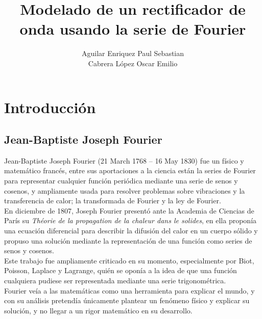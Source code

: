 \documentclass[a4paper,12pt]{article}
\title{Modelado de un rectificador de onda usando la serie de Fourier}
\author{
  Aguilar Enriquez Paul Sebastian\\
  Cabrera López Oscar Emilio
}
\begin{document}
\thispagestyle{fancy}
\maketitle
\newpage
\tableofcontents
\newpage

\section{Introducción}

\subsection{Jean-Baptiste Joseph Fourier}
\indent Jean-Baptiste Joseph Fourier (21 March 1768 – 16 May 1830) fue un físico y matemático francés, entre sus aportaciones a la ciencia están la series de Fourier para representar cualquier función periódica mediante una serie de senos y cosenos, y ampliamente usada para resolver problemas sobre vibraciones y la transferencia de calor; la transformada de Fourier y la ley de Fourier.\\
\indent En diciembre de 1807, Joseph Fourier presentó ante la Academia de Ciencias de París su \textit{Théorie de la propagation de la chaleur dans le solides}, en ella proponía una ecuación diferencial para describir la difusión del calor en un cuerpo sólido y propuso una solución mediante la representación de una función como series de senos y cosenos.\\
\indent Este trabajo fue ampliamente criticado en su momento, especialmente por Biot, Poisson, Laplace y Lagrange, quién se oponía a la idea de que una función cualquiera pudiese ser representada mediante una serie trigonométrica.\\
\indent Fourier veía a las matemáticas como una herramienta para explicar el mundo, y con su análisis pretendía únicamente plantear un fenómeno físico y explicar su solución, y no llegar a un rigor matemático en su desarrollo.
\end{document}

